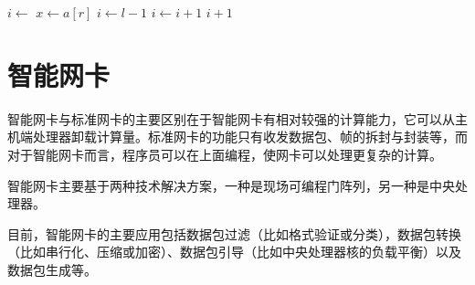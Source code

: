 \makeatletter
\newenvironment{breakablealgorithm2}
  {%
   \begin{center}
     \refstepcounter{algorithm}%
     \hrule height.8pt depth0pt \kern2pt%
     \renewcommand{\caption}[2][\relax]{%
       {\raggedright\textbf{\ALG@name~\thealgorithm} ##2\par}%
       \ifx\relax##1\relax %
         \addcontentsline{loa}{algorithm}{\protect\numberline{\thealgorithm}##2}%
       \else %
         \addcontentsline{loa}{algorithm}{\protect\numberline{\thealgorithm}##1}%
       \fi
       \kern2pt\hrule\kern2pt
     }
  }{%
     \kern2pt\hrule\relax%
   \end{center}
  }
\makeatother
\begin{breakablealgorithm}
\begin{algorithmic}[1]
\State $i \gets$ 
\State {}
\State $x \gets a[r]$
\State $i \gets l - 1$
\State $i \gets i + 1$
\State {}
\EndIf
\EndFor
\State {}
\State \Return $i + 1$
\EndProcedure
\end{algorithmic}
\end{breakablealgorithm}

\section{智能网卡}
智能网卡与标准网卡的主要区别在于智能网卡有相对较强的计算能力，它可以从主机端处理器卸载计算量。标准网卡的功能只有收发数据包、帧的拆封与封装等，而对于智能网卡而言，程序员可以在上面编程，使网卡可以处理更复杂的计算。

智能网卡主要基于两种技术解决方案，一种是现场可编程门阵列，另一种是中央处理器。

目前，智能网卡的主要应用包括数据包过滤（比如格式验证或分类），数据包转换（比如串行化、压缩或加密）、数据包引导（比如中央处理器核的负载平衡）以及数据包生成等。